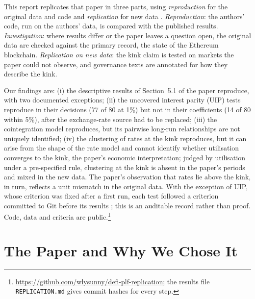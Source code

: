 \documentclass[11pt]{article}
\begin{document}
This report replicates that paper in three parts, using \emph{reproduction} for the original data and code and \emph{replication} for new data \citep{broman2017recommendations}. \emph{Reproduction}: the authors' code, run on the authors' data, is compared with the published results. \emph{Investigation}: where results differ or the paper leaves a question open, the original data are checked against the primary record, the state of the Ethereum blockchain. \emph{Replication on new data}: the kink claim is tested on markets the paper could not observe, and governance texts are annotated for how they describe the kink.

Our findings are:
(i) the descriptive results of Section~5.1 of the paper reproduce, with two documented exceptions;
(ii) the uncovered interest parity (UIP) tests reproduce in their decisions (77 of 80 at 1\%) but not in their coefficients (14 of 80 within 5\%), after the exchange-rate source had to be replaced;
(iii) the cointegration model reproduces, but its pairwise long-run relationships are not uniquely identified;
(iv) the clustering of rates at the kink reproduces, but it can arise from the shape of the rate model and cannot identify whether utilisation converges to the kink, the paper's economic interpretation; judged by utilisation under a pre-specified rule, clustering at the kink is absent in the paper's periods and mixed in the new data. The paper's observation that rates lie above the kink, in turn, reflects a unit mismatch in the original data.
With the exception of UIP, whose criterion was fixed after a first run, each test followed a criterion committed to Git before its results \citep{nosek2018preregistration}; this is an auditable record rather than proof. Code, data and criteria are public.\footnote{\url{https://github.com/wlysunny/defi-plf-replication}; the results file \texttt{REPLICATION.md} gives commit hashes for every step.}

\section{The Paper and Why We Chose It}
\end{document}
